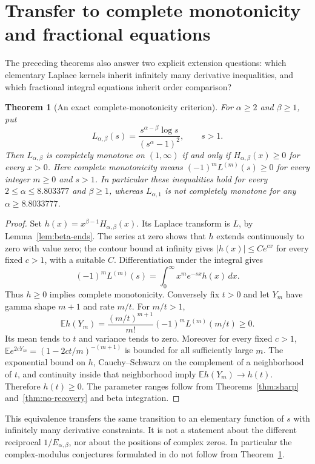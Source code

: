 \documentclass[11pt,a4paper]{article}
\theoremstyle{plain}
\newtheorem{theorem}{Theorem}[section]
\theoremstyle{remark}
\begin{document}
\section{Transfer to complete monotonicity and fractional equations}
\label{sec:transfers}
The preceding theorems also answer two explicit extension questions: which
elementary Laplace kernels inherit infinitely many derivative inequalities,
and which fractional integral equations inherit order comparison?

\begin{theorem}[An exact complete-monotonicity criterion]\label{thm:CM}
For $\alpha\ge2$ and $\beta\ge1$, put
\[
 L_{\alpha,\beta}(s)=\frac{s^{\alpha-\beta}\log s}{(s^\alpha-1)^2},\qquad s>1.
\]
Then $L_{\alpha,\beta}$ is completely monotone on $(1,\infty)$ if and only if
$H_{\alpha,\beta}(x)\ge0$ for every $x>0$. Here complete monotonicity means
$(-1)^m L^{(m)}(s)\ge0$ for every integer $m\ge0$ and $s>1$.
In particular these inequalities hold for every $2\le\alpha\le8.803377$
and $\beta\ge1$, whereas $L_{\alpha,1}$ is not completely monotone for any
$\alpha\ge8.8033777$.
\end{theorem}
\begin{proof}
Set $h(x)=x^{\beta-1}H_{\alpha,\beta}(x)$. Its Laplace transform is $L$, by
Lemma~\ref{lem:beta-ends}. The series at zero shows that $h$ extends continuously
to zero with value zero; the contour bound at infinity gives $|h(x)|\le Ce^{cx}$
for every fixed $c>1$, with a suitable $C$. Differentiation under the integral gives
\[
 (-1)^m L^{(m)}(s)=\int_0^\infty x^m e^{-sx}h(x)\,dx.
\]
Thus $h\ge0$ implies complete monotonicity. Conversely fix $t>0$ and let
$Y_m$ have gamma shape $m+1$ and rate $m/t$. For $m/t>1$,
\[
 \mathbb E h(Y_m)=\frac{(m/t)^{m+1}}{m!}
                  (-1)^mL^{(m)}(m/t)\ge0.
\]
Its mean tends to $t$ and variance tends to zero. Moreover for every fixed
$c>1$, $\mathbb E e^{2cY_m}=(1-2ct/m)^{-(m+1)}$ is bounded for all sufficiently
large $m$. The exponential bound on $h$, Cauchy--Schwarz on the complement of
a neighborhood of $t$, and continuity inside that neighborhood imply
$\mathbb E h(Y_m)\to h(t)$. Therefore $h(t)\ge0$. The parameter ranges follow
from Theorems~\ref{thm:sharp} and~\ref{thm:no-recovery} and beta integration.
\end{proof}

This equivalence transfers the same transition to an elementary function of
$s$ with infinitely many derivative constraints. It is not a statement about
the different reciprocal $1/E_{\alpha,\beta}$, nor about the positions of
complex zeros. In particular the complex-modulus conjectures formulated in
\cite[Section 4]{GGPS} do not follow from Theorem~\ref{thm:CM}.
\end{document}
